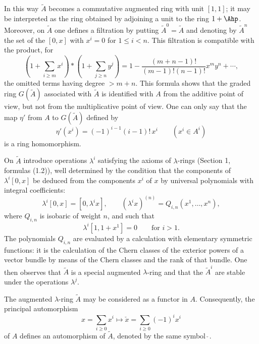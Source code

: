 In this way $\widetilde A$ becomes a commutative augmented ring with unit $[1,1]$; it may be interpreted as the ring obtained by adjoining a unit to the ring $1+\Ahp$. Moreover, on $\widetilde A$ one defines a filtration by putting $\widetilde A^0=\widetilde A$ and denoting by $\widetilde A^n$ the set of the $[0,x]$ with $x^i=0$ for $1\leq i<n$. This filtration is compatible with the product, for
\begin{equation}\tag{1.18}
\left(1+\sum_{i\geq m}x^i\right)*\left(1+\sum_{j\geq n}y^j\right)
=1-\frac{(m+n-1)!}{(m-1)!(n-1)!}x^m y^n+\cdots,
\end{equation}
the omitted terms having degree $>m+n$. This formula shows that the graded ring $G(\widetilde A)$ associated with $\widetilde A$ is identified with $A$ from the additive point of view, but not from the multiplicative point of view. One can only say that the map $\eta'$ from $A$ to $G(\widetilde A)$ defined by
\begin{equation}\tag{1.19}
\eta'(x^i)=(-1)^{i-1}(i-1)!\,x^i\qquad (x^i\in A^i)
\end{equation}
is a ring homomorphism.

On $\widetilde A$ introduce operations $\lambda^i$ satisfying the axioms of $\lambda$-rings (Section 1, formulas (1.2)), well determined by the condition that the components of $\lambda^i[0,x]$ be deduced from the components $x^i$ of $x$ by universal polynomials with integral coefficients:
\begin{equation}\tag{1.20}
\lambda^i[0,x]=[0,\lambda^i x],\qquad (\lambda^i x)^{(n)}=Q_{i,n}(x^1,\ldots,x^n),
\end{equation}
where $Q_{i,n}$ is isobaric of weight $n$, and such that
\begin{equation}\tag{1.21}
\lambda^i[1,1+x^1]=0\qquad\text{for }i>1.
\end{equation}
The polynomials $Q_{i,n}$ are evaluated by a calculation with elementary symmetric functions: it is the calculation of the Chern classes of the exterior powers of a vector bundle by means of the Chern classes and the rank of that bundle. One then observes that $\widetilde A$ is a special augmented $\lambda$-ring and that the $\widetilde A^i$ are stable under the operations $\lambda^j$.

The augmented $\lambda$-ring $\widetilde A$ may be considered as a functor in $A$. Consequently, the principal automorphism
\[
x=\sum_{i\geq 0}x^i\longmapsto \check x=\sum_{i\geq 0}(-1)^i x^i
\]
of $A$ defines an automorphism of $\widetilde A$, denoted by the same symbol $\check{\ }$.

